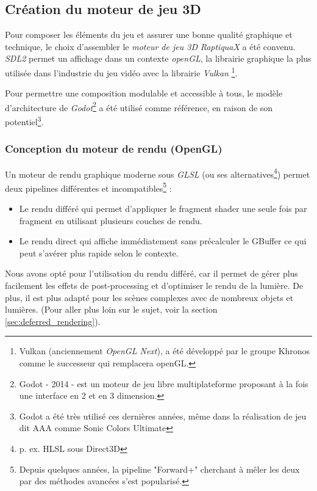 \subsection{Création du moteur de jeu 3D}
    Pour composer les éléments du jeu et assurer une bonne qualité
    graphique et technique, le choix d'assembler le \emph{moteur de jeu 3D}
    \og \emph{RaptiquaX} \fg{} a été convenu. \emph{\Gls{SDL2}} permet un affichage dans un contexte
    \emph{\Gls{openGL}}, la librairie graphique la plus utilisée dans
    l'industrie du jeu vidéo avec la librairie \emph{Vulkan}
    \footnote{Vulkan \small{(anciennement \emph{OpenGL Next})}, a été
    développé par le groupe Khronos comme le successeur qui remplacera
    \Gls{openGL}.}.

    Pour permettre une composition modulable et accessible à tous, le modèle
    d'architecture de \emph{Godot}\footnote{Godot - 2014 - est un moteur de
    jeu libre multiplateforme proposant à la fois une interface en 2 et
    en 3 dimension.} a été utilisé comme référence, en raison de son
    potentiel\footnote{Godot a été très utilisé ces dernières années, même
    dans la réalisation de jeu dit AAA comme
    Sonic Colors Ultimate\cite{soniccoloru} }.

\subsubsection{Conception du moteur de rendu (OpenGL)}
    Un moteur de rendu graphique moderne sous \emph{\Gls{GLSL}} (ou ses
    alternatives\footnote{p. ex. HLSL sous Direct3D}) permet deux pipelines
    différentes et incompatibles\footnote{Depuis quelques années, la pipeline
    "Forward+" cherchant à mêler les deux par des méthodes avancées s'est
    popularisé.} \cite{iehl_deferred_vs_forward} :
    \begin{itemize}
        \item Le rendu différé qui permet d'appliquer le \gls{fragment shader}
        une seule fois par \gls{fragment} en utilisant plusieurs couches de
        rendu.
        \item Le rendu direct qui affiche immédiatement sans précalculer le
        \gls{GBuffer} ce qui peut s'avérer plus rapide selon le
        contexte.
    \end{itemize}

    Nous avons opté pour l'utilisation du rendu différé, car il permet de
    gérer plus facilement les effets de post-processing et d'optimiser le
    rendu de la lumière. De plus, il est plus adapté pour les scènes
    complexes avec de nombreux objets et lumières. (Pour aller plus loin sur
    le sujet, voir la section \ref{sec:deferred_rendering}).


